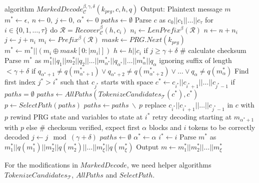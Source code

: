 \begin{Pseudocode}[caption={
$MarkedDecode$ algorithm.
In comparison to Meteor's $Decode$ algorithm, $MarkedDecode$ verifies the checksums $q(m_i)$ of blocks $m_i$.
If the checksum does not match, a decoding error occurred.
It then performs a lookbehind on the stegotext and generates all possible tokenizations $paths$ for a substring of $c$.
Afterwards, it rewinds the internal state and retry decoding with a path $p$ selected from $paths$.
}, label={alg:marked-decode}]
algorithm $MarkedDecode_{\mathcal{C}}^{\beta,\gamma,\delta}(k_{prg}, c, h, q)$
  Output: Plaintext message $m$
  $m^* \leftarrow \epsilon,~ n \leftarrow 0,~ j \leftarrow 0,~ \alpha^* \leftarrow 0$
  $paths \leftarrow \emptyset$
  Parse $c$ as $c_0 || c_1 || \dots || c_{\tau}$
  for $i \in \{ 0, 1, \dots, \tau \}$ do
    $\mathcal{R} = Recover_{\mathcal{C}}^\beta(h, c_i)$
    $n_i \leftarrow LenPrefix^\beta(\mathcal{R})$
    $n \leftarrow n + n_i$
    $j \leftarrow j + n_i$
    $m_i \leftarrow Prefix^\beta(\mathcal{R})$
    $mask \leftarrow PRG.Next(k_{prg})$
    $m^* \leftarrow m^* || (m_i \oplus mask[0: |m_i|])$
    $h \leftarrow h||c_i$
    if $j \geq \gamma + \delta$
      # calculate checksum
      Parse $m^*$ as $m^*_1||q_1||m^*_2||q_2||\dots||m^*_{\alpha^*}||q_{\alpha^*}||\dots||m^*_\alpha||q_\alpha$ ignoring suffix of length $< \gamma+\delta$
      if $q_{\alpha^*+1} \neq q(m^*_{\alpha^*+1}) \lor q_{\alpha^*+2} \neq q(m^*_{\alpha^*+2}) \lor \dots \lor q_\alpha \neq q(m^*_\alpha)$
        Find first index $j^* > i^*$ such that $c_{j^*}$ starts with space
        $c^* \leftarrow c_{i^*} || c_{i^*+1} || \dots || c_{j^*-1}$
        if $paths = \emptyset$
          $paths \leftarrow AllPaths(TokenizeCandidates_{\mathcal{T}}(c^*), c^*)$
        $p \leftarrow SelectPath(paths)$
        $paths \leftarrow paths~ \backslash~ p$
        replace $c_{i^*}||c_{i^*+1}||\dots||c_{j^*-1}$ in $c$ with $p$
        rewind PRG state and variables to state at $i^*$
        retry decoding starting at $m_{\alpha^*+1}$ with $p$
      else  # checksum verified, expect first $\alpha$ blocks and $i$ tokens to be correctly decoded
        $j \leftarrow j \mod (\gamma+\delta)$
        $paths \leftarrow \emptyset$
        $\alpha^* \leftarrow \alpha$
        $i^* \leftarrow i$
  Parse $m^*$ as $m^*_1||q(m^*_1)||m^*_2||q(m^*_2)||\dots||m^*_\xi||q(m^*_\xi)$
  Output $m \leftarrow m^*_1||m^*_2||\dots||m^*_\xi$
\end{Pseudocode}

For the modifications in $MarkedDecode$, we need helper algorithms $TokenizeCandidates_{\mathcal{T}}$, $AllPaths$ and $SelectPath$.

